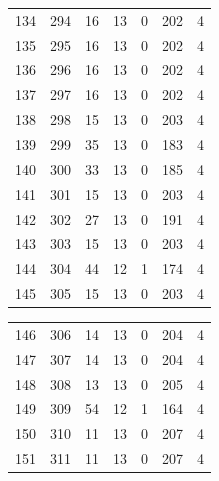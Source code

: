 \documentclass[a4paper,twoside,12pt]{book}
\begin{document}
\begin{appendices}
\begin{table}
\begin{tabular}{lrrrrrr}
		134 &    294 &        16 &        13 &               0 &             202 &         4 \\
		135 &    295 &        16 &        13 &               0 &             202 &         4 \\
		136 &    296 &        16 &        13 &               0 &             202 &         4 \\
		137 &    297 &        16 &        13 &               0 &             202 &         4 \\
		138 &    298 &        15 &        13 &               0 &             203 &         4 \\
		139 &    299 &        35 &        13 &               0 &             183 &         4 \\
		140 &    300 &        33 &        13 &               0 &             185 &         4 \\
		141 &    301 &        15 &        13 &               0 &             203 &         4 \\
		142 &    302 &        27 &        13 &               0 &             191 &         4 \\
		143 &    303 &        15 &        13 &               0 &             203 &         4 \\
		144 &    304 &        44 &        12 &               1 &             174 &         4 \\
		145 &    305 &        15 &        13 &               0 &             203 &         4 \\
		\bottomrule
	\end{tabular}		
\end{table}
\begin{table}
	\centering
	\begin{tabular}{lrrrrrr}
		\toprule
		146 &    306 &        14 &        13 &               0 &             204 &         4 \\
		147 &    307 &        14 &        13 &               0 &             204 &         4 \\
		148 &    308 &        13 &        13 &               0 &             205 &         4 \\
		149 &    309 &        54 &        12 &               1 &             164 &         4 \\
		150 &    310 &        11 &        13 &               0 &             207 &         4 \\
		151 &    311 &        11 &        13 &               0 &             207 &         4 \\

\end{tabular}
\end{table}
\end{appendices}
\end{document}
